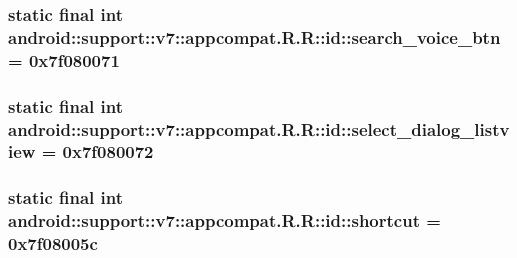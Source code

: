 \hypertarget{classandroid_1_1support_1_1v7_1_1appcompat_1_1_r_1_1id_e777ca4471eb9b4e49c2808eedd95d16}{
\subsubsection[{search\_\-voice\_\-btn}]{\setlength{\rightskip}{0pt plus 5cm}static final int android::support::v7::appcompat.R.R::id::search\_\-voice\_\-btn = 0x7f080071}}
\label{classandroid_1_1support_1_1v7_1_1appcompat_1_1_r_1_1id_e777ca4471eb9b4e49c2808eedd95d16}


\hypertarget{classandroid_1_1support_1_1v7_1_1appcompat_1_1_r_1_1id_84c2f33f1e898bf1ac8cb2bd9b3e80f7}{
\subsubsection[{select\_\-dialog\_\-listview}]{\setlength{\rightskip}{0pt plus 5cm}static final int android::support::v7::appcompat.R.R::id::select\_\-dialog\_\-listview = 0x7f080072}}
\label{classandroid_1_1support_1_1v7_1_1appcompat_1_1_r_1_1id_84c2f33f1e898bf1ac8cb2bd9b3e80f7}


\hypertarget{classandroid_1_1support_1_1v7_1_1appcompat_1_1_r_1_1id_04c6619454294b29d44d333fcf7cf620}{
\subsubsection[{shortcut}]{\setlength{\rightskip}{0pt plus 5cm}static final int android::support::v7::appcompat.R.R::id::shortcut = 0x7f08005c}}
\label{classandroid_1_1support_1_1v7_1_1appcompat_1_1_r_1_1id_04c6619454294b29d44d333fcf7cf620}


